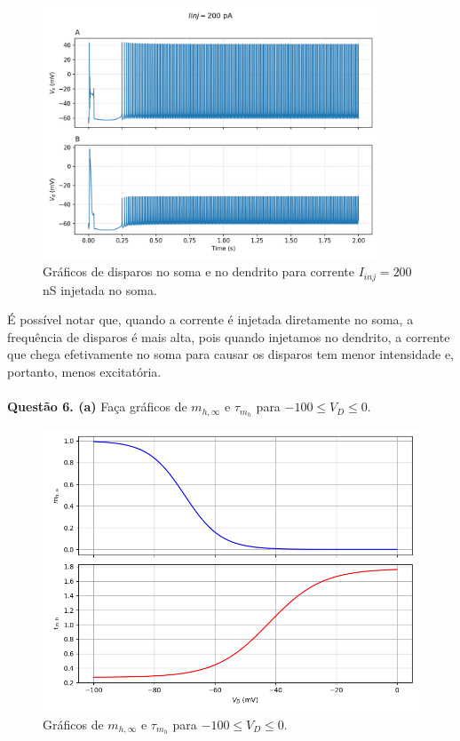 \documentclass[english,11pt,a4paper]{article}
\begin{document}
	\begin{figure}[H]
		\centering
		\includegraphics[width=10cm]{../figures/ex_5_I200_soma.png}
		\caption{Gráficos de disparos no soma e no dendrito para corrente $I_{inj} = 200$ nS injetada no soma.}
	\end{figure}
	
	É possível notar que, quando a corrente é injetada diretamente no soma, a frequência de disparos é mais alta, pois quando injetamos no dendrito, a corrente que chega efetivamente no soma para causar os disparos tem menor intensidade e, portanto, menos excitatória.\\\\
	
	\noindent\textbf{Questão 6. (a)} Faça gráficos de $m_{h,\infty}$ e $\tau_{m_h}$ para $-100 \leq V_D \leq 0$.
	
	\begin{figure}[H]
		\centering
		\includegraphics[width=12cm]{../figures/ex_6a.png}
		\caption{Gráficos de $m_{h,\infty}$ e $\tau_{m_h}$ para $-100 \leq V_D \leq 0$.}
	\end{figure}
	
\end{document}
